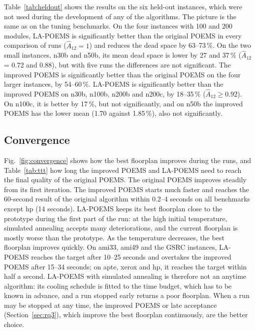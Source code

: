 Table~\ref{tab:heldout} shows the results on the six held-out instances, which were not used during the development of any of the algorithms. The picture is the same as on the tuning benchmarks. On the four instances with 100 and 200 modules, LA-POEMS is significantly better than the original POEMS in every comparison of runs ($\hat{A}_{12} = 1$) and reduces the dead space by 63--73\,\%. On the two small instances, n30b and n50b, its mean dead space is lower by 27 and 37\,\% ($\hat{A}_{12}$ = 0.72 and 0.88), but with five runs the differences are not significant. The improved POEMS is significantly better than the original POEMS on the four larger instances, by 54--60\,\%. LA-POEMS is significantly better than the improved POEMS on n30b, n100b, n200b and n200c, by 18--35\,\% ($\hat{A}_{12} \geq 0.92$). On n100c, it is better by 17\,\%, but not significantly, and on n50b the improved POEMS has the lower mean (1.70 against 1.85\,\%), also not significantly.



\subsection{Convergence}

Fig.~\ref{fig:convergence} shows how the best floorplan improves during the runs, and Table~\ref{tab:ttt} how long the improved POEMS and LA-POEMS need to reach the final quality of the original POEMS. The original POEMS improves steadily from its first iteration. The improved POEMS starts much faster and reaches the 60-second result of the original algorithm within 0.2--4 seconds on all benchmarks except hp (14 seconds). LA-POEMS keeps its best floorplan close to the prototype during the first part of the run: at the high initial temperature, simulated annealing accepts many deteriorations, and the current floorplan is mostly worse than the prototype. As the temperature decreases, the best floorplan improves quickly. On ami33, ami49 and the GSRC instances, LA-POEMS reaches the target after 10--25 seconds and overtakes the improved POEMS after 15--34 seconds; on apte, xerox and hp, it reaches the target within half a second. LA-POEMS with simulated annealing is therefore not an anytime algorithm: its cooling schedule is fitted to the time budget, which has to be known in advance, and a run stopped early returns a poor floorplan. When a run may be stopped at any time, the improved POEMS or late acceptance (Section~\ref{sec:rq3}), which improve the best floorplan continuously, are the better choice.

